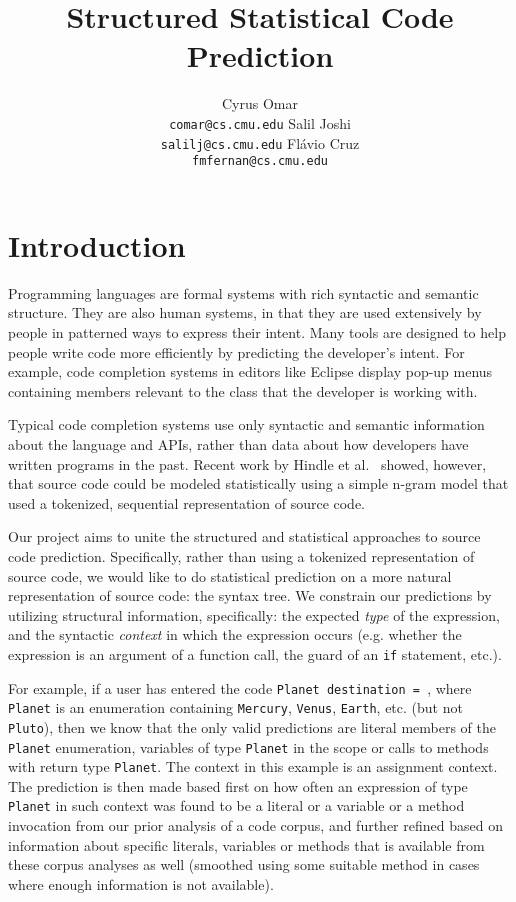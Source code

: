 \documentclass{article} %
\title{Structured Statistical Code Prediction}
\author{
  Cyrus Omar\\
  \texttt{comar@cs.cmu.edu}
  \And
  Salil Joshi\\
  \texttt{salilj@cs.cmu.edu}
  \And Fl\'avio Cruz\\
  \texttt{fmfernan@cs.cmu.edu}
}
\begin{document}
\maketitle

\section*{Introduction}
Programming languages are formal systems with rich syntactic and semantic structure. They are
also human systems, in that they are used extensively by people in patterned ways to express their
intent. Many tools are designed to help people write code more efficiently by predicting
the developer's intent. For example, code completion systems in editors like Eclipse display pop-up menus containing members relevant to the class that the developer is working with. 

Typical code completion systems use only syntactic and semantic
information about the language and APIs, rather than data about how developers have written programs
in the past. Recent work by Hindle et al.~\cite{Hindle:2012:NS:2337223.2337322} showed, however, that source code could be modeled statistically
using a simple n-gram model that used a tokenized, sequential representation of source code. 

Our project aims to unite the structured and statistical approaches to source code prediction.
Specifically, rather than using a tokenized representation of source code, we would like to do
statistical prediction on a more natural representation of source code: the syntax tree.  We constrain our predictions by utilizing structural information, specifically: the expected \emph{type} of the expression, and the syntactic \emph{context} in which the expression occurs (e.g. whether the expression is an argument of a function call, the guard of an \verb|if| statement, etc.).

For example, if a user has entered the code \texttt{Planet destination = }, where \verb|Planet| is an enumeration containing \verb|Mercury|, \verb|Venus|, \verb|Earth|, etc. (but not \verb|Pluto|), then we know that the only valid predictions are literal members of the \verb|Planet| enumeration, variables of type \verb|Planet| in the scope or calls to methods with return type \texttt{Planet}. The context in this example is an assignment context. The prediction is then made based first on how often an expression of type \verb|Planet| in such context was found to be a literal or a variable or a method invocation from our prior analysis of a code corpus, and further refined based on information about specific literals, variables or methods that is available from these corpus analyses as well (smoothed using some suitable method in cases where enough information is not available).
\end{document}
